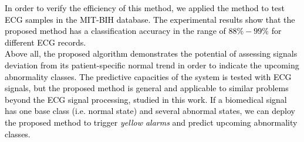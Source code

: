\textcolor{black}{%
In order to verify the efficiency of this method, we applied the method to test ECG samples in the MIT-BIH database\cite{mitdb}. The experimental results show that the proposed method has a classification accuracy in the range of $88\%-99\%$ for different ECG records.\\
Above all, the proposed algorithm demonstrates the potential of assessing signals deviation from its patient-specific normal trend in order to indicate the upcoming abnormality classes. The predictive capacities of the system is tested with ECG signals, but the proposed method is general and applicable to similar problems beyond the ECG signal processing, studied in this work. If a biomedical signal has one base class (i.e. normal state) and several abnormal states, we can deploy the proposed method to trigger \textit{yellow alarms} and predict upcoming abnormality classes.}
  

